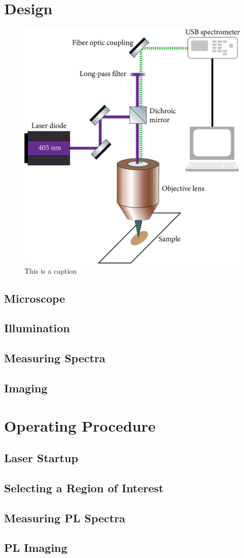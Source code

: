 \section{Design}

\begin{figure}[h]
    \centering
    \includegraphics[width=.75\textwidth]{img/optical-diagram.png}
    \caption{This is a caption}
    \label{img:optical-diagram}
\end{figure}

\subsection{Microscope}
\subsection{Illumination}
\subsection{Measuring Spectra}
\subsection{Imaging}

\section{Operating Procedure}
\subsection{Laser Startup} %
\subsection{Selecting a Region of Interest}
\subsection{Measuring PL Spectra}
\subsection{PL Imaging}